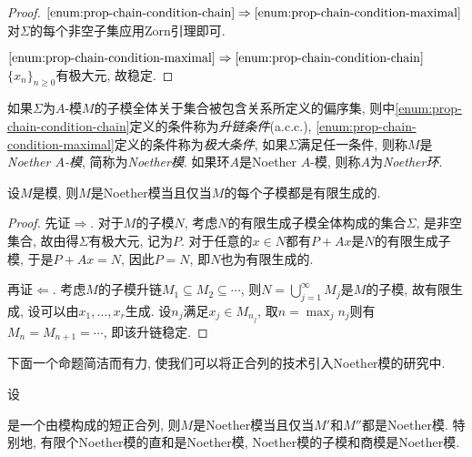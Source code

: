 \begin{proof}
  $\ref{enum:prop-chain-condition-chain}\Rightarrow\ref{enum:prop-chain-condition-maximal}$ 对$\Sigma$的每个非空子集应用Zorn引理即可.

  $\ref{enum:prop-chain-condition-maximal}\Rightarrow\ref{enum:prop-chain-condition-chain}$ $\{x_n\}_{n\geq 0}$有极大元, 故稳定.
\end{proof}

如果$\Sigma$为$A$-模$M$的子模全体关于集合被包含关系所定义的偏序集, 则中\ref{enum:prop-chain-condition-chain}定义的条件称为\emph{升链条件}(a.c.c.), \ref{enum:prop-chain-condition-maximal}定义的条件称为\emph{极大条件}, 如果$\Sigma$满足任一条件, 则称$M$是\emph{Noether $A$-模}, 简称为\emph{Noether模}. 如果环$A$是Noether $A$-模, 则称$A$为\emph{Noether环}.

\begin{proposition}\label{prop:noethermodule}
  设$M$是模, 则$M$是Noether模当且仅当$M$的每个子模都是有限生成的.
\end{proposition}

\begin{proof}
  先证$\Rightarrow$. 对于$M$的子模$N$, 考虑$N$的有限生成子模全体构成的集合$\Sigma$, 是非空集合, 故由得$\Sigma$有极大元, 记为$P$. 对于任意的$x\in N$都有$P+Ax$是$N$的有限生成子模, 于是$P+Ax=N$, 因此$P=N$, 即$N$也为有限生成的.

  再证$\Leftarrow$. 考虑$M$的子模升链$M_1\subseteq M_2\subseteq \dotsb$, 则$N=\bigcup_{j=1}^\infty M_j$是$M$的子模, 故有限生成, 设可以由$x_1, \dotsc, x_r$生成. 设$n_j$满足$x_j\in M_{n_j}$, 取$n=\max_j n_j$则有$M_n=M_{n+1}=\dotsb$, 即该升链稳定.
\end{proof}

下面一个命题简洁而有力, 使我们可以将正合列的技术引入Noether模的研究中.

\begin{proposition}\label{prop:noethermoduleexactsequence}
  设
  是一个由模构成的短正合列, 则$M$是Noether模当且仅当$M'$和$M''$都是Noether模. 特别地, 有限个Noether模的直和是Noether模, Noether模的子模和商模是Noether模.
\end{proposition}

